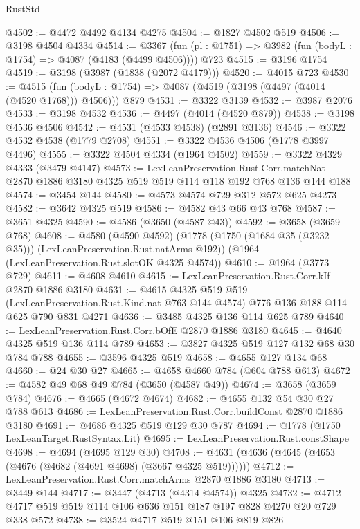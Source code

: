 \begin{lexlean}{RustStd}
\begin{coremodule}
@4502 := @4472 @4492 @4134 @4275
@4504 := @1827 @4502 @519
@4506 := @3198 @4504 @4334
@4514 := @3367 (fun (pl : @1751) => @3982 (fun (bodyL : @1754) => @4087 (@4183 (@4499 @4506)))) @723
@4515 := @3196 @1754
@4519 := @3198 (@3987 (@1838 (@2072 @4179)))
@4520 := @4015 @723
@4530 := @4515
    (fun (bodyL : @1754) => @4087 (@4519 (@3198 (@4497 (@4014 (@4520 @1768))) @4506)))
    @879
@4531 := @3322 @3139
@4532 := @3987 @2076
@4533 := @3198 @4532
@4536 := @4497 (@4014 (@4520 @879))
@4538 := @3198 @4536 @4506
@4542 := @4531 (@4533 @4538) (@2891 @3136)
@4546 := @3322 @4532 @4538 (@1779 @2708)
@4551 := @3322 @4536 @4506 (@1778 @3997 @4496)
@4555 := @3322 @4504 @4334 (@1964 @4502)
@4559 := @3322 @4329 @4333 (@3479 @4147)
@4573 := LexLeanPreservation.Rust.Corr.matchNat
    @2870
    @1886
    @3180
    @4325
    @519
    @519
    @114
    @118
    @192
    @768
    @136
    @144
    @188
@4574 := @3454 @144
@4580 := @4573 @4574 @729 @312 @572 @625 @4273
@4582 := @3642 @4325 @519
@4586 := @4582 @43 @66 @43 @768
@4587 := @3651 @4325
@4590 := @4586 (@3650 (@4587 @43))
@4592 := @3658 (@3659 @768)
@4608 := @4580
    (@4590 @4592)
    (@1778 (@1750 (@1684 @35 (@3232 @35))) (LexLeanPreservation.Rust.natArms @192))
    (@1964 (LexLeanPreservation.Rust.slotOK @4325 @4574))
@4610 := @1964 (@3773 @729)
@4611 := @4608 @4610
@4615 := LexLeanPreservation.Rust.Corr.kIf @2870 @1886 @3180
@4631 := @4615
    @4325
    @519
    @519
    (LexLeanPreservation.Rust.Kind.nat @763 @144 @4574)
    @776
    @136
    @188
    @114
    @625
    @790
    @831
    @4271
@4636 := @3485 @4325 @136 @114 @625 @789
@4640 := LexLeanPreservation.Rust.Corr.bOfE @2870 @1886 @3180
@4645 := @4640 @4325 @519 @136 @114 @789
@4653 := @3827 @4325 @519 @127 @132 @68 @30 @784 @788
@4655 := @3596 @4325 @519
@4658 := @4655 @127 @134 @68
@4660 := @24 @30 @27
@4665 := @4658 @4660 @784 (@604 @788 @613)
@4672 := @4582 @49 @68 @49 @784 (@3650 (@4587 @49))
@4674 := @3658 (@3659 @784)
@4676 := @4665 (@4672 @4674)
@4682 := @4655 @132 @54 @30 @27 @788 @613
@4686 := LexLeanPreservation.Rust.Corr.buildConst @2870 @1886 @3180
@4691 := @4686 @4325 @519 @129 @30 @787
@4694 := @1778 (@1750 LexLeanTarget.RustSyntax.Lit)
@4695 := LexLeanPreservation.Rust.constShape
@4698 := @4694 (@4695 @129 @30)
@4708 := @4631 (@4636 (@4645 (@4653 (@4676 (@4682 (@4691 @4698) (@3667 @4325 @519))))))
@4712 := LexLeanPreservation.Rust.Corr.matchArms @2870 @1886 @3180
@4713 := @3449 @144
@4717 := @3447 (@4713 (@4314 @4574)) @4325
@4732 := @4712 @4717 @519 @519 @114 @106 @636 @151 @187 @197 @828 @4270 @20 @729 @338 @572
@4738 := @3524 @4717 @519 @151 @106 @819 @826

\end{coremodule}
\end{lexlean}

